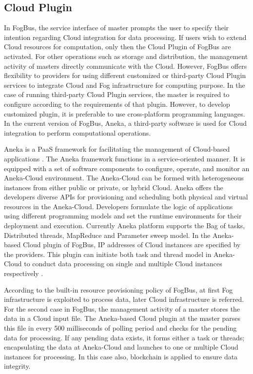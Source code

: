 \documentclass[final,5p,times,twocolumn]{elsarticle}
\begin{document}
\subsection{Cloud Plugin}
In FogBus, the service interface of master prompts the user to specify their intention regarding Cloud integration for data processing. If users wish to extend Cloud resources for computation, only then the Cloud Plugin of FogBus are activated. For other operations such as storage and distribution, the management activity of masters directly communicate with the Cloud. However, FogBus offers flexibility to providers for using different customized or third-party Cloud Plugin services to integrate Cloud and Fog infrastructure for computing purpose. In the case of running third-party Cloud Plugin services, the master is required to configure according to the requirements of that plugin. However, to develop customized plugin, it is preferable to use cross-platform programming languages. In the current version of FogBus, Aneka, a third-party software is used for Cloud integration to perform computational operations.
%
\par Aneka is a PaaS framework for facilitating the management of Cloud-based applications \cite{aneka}. The Aneka framework functions in a service-oriented manner. It is equipped with a set of software components to configure, operate, and monitor an Aneka-Cloud environment. The Aneka-Cloud can be formed with heterogeneous instances from either public or private, or hybrid Cloud. Aneka offers the developers diverse APIs for provisioning and scheduling both physical and virtual resources in the Aneka-Cloud. Developers formulate the logic of applications using different programming models and set the runtime environments for their deployment and execution. Currently Aneka platform supports the Bag of tasks, Distributed threads, MapReduce and Parameter sweep model. In the Aneka-based Cloud plugin of FogBus, IP addresses of Cloud instances are specified by the providers. This plugin can initiate both task and thread model in Aneka-Cloud to conduct data processing on single and multiple Cloud instances respectively \cite{aneka-2}.  
%
\par According to the built-in resource provisioning policy of FogBus, at first Fog infrastructure is exploited to process data, later Cloud infrastructure is referred. For the second case in FogBus, the management activity of a master stores the data in a Cloud input file. The Aneka-based Cloud plugin at the master parses this file in every 500 milliseconds of polling period and checks for the pending data for processing. If any pending data exists, it forms either a task or threads; encapsulating the data at Aneka-Cloud and launches to one or multiple Cloud instances for processing. In this case also, blockchain is applied to ensure data integrity.
%
\end{document}
